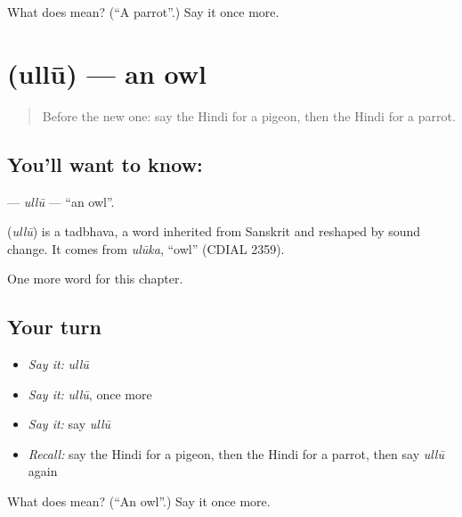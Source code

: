 \begin{tcolorbox}[breakable,colback=teal!4,colframe=teal!35!black,title={Before you move on}]
What does  mean? (\textquotedblleft{}A parrot\textquotedblright{}.) Say it once more.
\end{tcolorbox}
\section[\texorpdfstring{\hi{उल्लू} (ullū)}{उल्लू (ullū)}]{ (ullū) — an owl}

\label{lesson:HI-C148-ullu}



\begin{quote}
Before the new one: say the Hindi for a pigeon, then the Hindi for a parrot.
\end{quote}

\subsection*{You'll want to know: }
\textbf{} — \emph{ullū} — \textquotedblleft{}an owl\textquotedblright{}.

\begin{cousinweb}
\textbf{} (\emph{ullū}) is a tadbhava, a word inherited from Sanskrit and reshaped by sound change. It comes from \emph{ulūka}, \textquotedblleft{}owl\textquotedblright{} (CDIAL 2359).
\end{cousinweb}

\begin{grammarlens}[title={What you've built}]
One more word for this chapter.
\end{grammarlens}

\subsection*{Your turn}
\begin{itemize}
\raggedright
  \item \emph{Say it:} \emph{ullū}
  \item \emph{Say it:} \emph{ullū}, once more
  \item \emph{Say it:} say \emph{ullū}
  \item \emph{Recall:} say the Hindi for a pigeon, then the Hindi for a parrot, then say \emph{ullū} again
\end{itemize}

\begin{tcolorbox}[breakable,colback=teal!4,colframe=teal!35!black,title={Before you move on}]
What does  mean? (\textquotedblleft{}An owl\textquotedblright{}.) Say it once more.
\end{tcolorbox}
